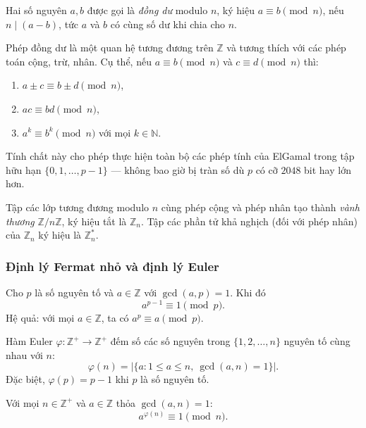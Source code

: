 \documentclass[../DoAn.tex]{subfiles}
\begin{document}
\begin{definition}[Đồng dư]
Hai số nguyên $a, b$ được gọi là \emph{đồng dư} modulo $n$, ký hiệu $a \equiv b \pmod{n}$, nếu $n \mid (a - b)$, tức $a$ và $b$ có cùng số dư khi chia cho $n$.
\end{definition}

\begin{proposition}
Phép đồng dư là một quan hệ tương đương trên $\mathbb{Z}$ và tương thích với các phép toán cộng, trừ, nhân. Cụ thể, nếu $a \equiv b \pmod{n}$ và $c \equiv d \pmod{n}$ thì:
\begin{enumerate}
	\item $a \pm c \equiv b \pm d \pmod{n}$,
	\item $ac \equiv bd \pmod{n}$,
	\item $a^k \equiv b^k \pmod{n}$ với mọi $k \in \mathbb{N}$.
\end{enumerate}
\end{proposition}

Tính chất này cho phép thực hiện toàn bộ các phép tính của ElGamal trong tập hữu hạn $\{0, 1, \ldots, p-1\}$ --- không bao giờ bị tràn số dù $p$ có cỡ $2048$ bit hay lớn hơn.

Tập các lớp tương đương modulo $n$ cùng phép cộng và phép nhân tạo thành \emph{vành thương} $\mathbb{Z}/n\mathbb{Z}$, ký hiệu tắt là $\mathbb{Z}_n$. Tập các phần tử khả nghịch (đối với phép nhân) của $\mathbb{Z}_n$ ký hiệu là $\mathbb{Z}_n^*$.

\subsubsection{Định lý Fermat nhỏ và định lý Euler}

\begin{theorem}
\label{thm:fermat}
Cho $p$ là số nguyên tố và $a \in \mathbb{Z}$ với $\gcd(a, p) = 1$. Khi đó
\[
	a^{p-1} \equiv 1 \pmod{p}.
\]
Hệ quả: với mọi $a \in \mathbb{Z}$, ta có $a^{p} \equiv a \pmod{p}$.
\end{theorem}

\begin{definition}
Hàm Euler $\varphi: \mathbb{Z}^+ \to \mathbb{Z}^+$ đếm số các số nguyên trong $\{1, 2, \ldots, n\}$ nguyên tố cùng nhau với $n$:
\[
	\varphi(n) = |\{a : 1 \leq a \leq n,\ \gcd(a, n) = 1\}|.
\]
Đặc biệt, $\varphi(p) = p - 1$ khi $p$ là số nguyên tố.
\end{definition}

\begin{theorem}[Euler]
Với mọi $n \in \mathbb{Z}^+$ và $a \in \mathbb{Z}$ thỏa $\gcd(a, n) = 1$:
\[
	a^{\varphi(n)} \equiv 1 \pmod{n}.
\]
\end{theorem}
\end{document}
